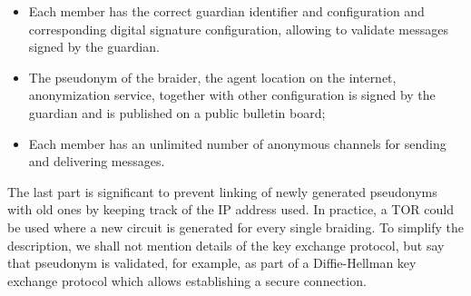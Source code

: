 \documentclass[12pt]{article}
\begin{document}
\begin{itemize}
\item Each member has the correct guardian identifier and configuration and corresponding digital signature configuration, allowing to validate messages signed by the guardian.
\item The pseudonym of the braider, the agent location on the internet, anonymization service, together with other configuration is signed by the guardian and is published on a public bulletin board;
\item Each member has an unlimited number of anonymous channels for sending and delivering messages. 
\end{itemize}

The last part is significant to prevent linking of newly generated pseudonyms with old ones by keeping track of the IP address used. In practice, a TOR could be used where a new circuit is generated for every single braiding. To simplify the description, we shall not mention details of the key exchange protocol, but say that pseudonym is validated, for example, as part of a Diffie-Hellman key exchange protocol which allows establishing a secure connection.




\end{document}
